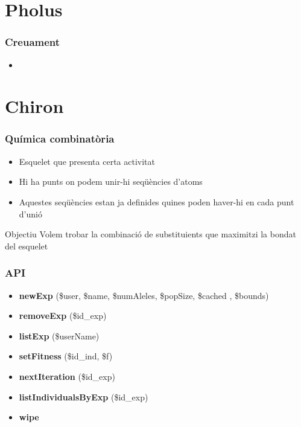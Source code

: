 \documentclass{beamer}
\begin{document}
\section{Pholus} %
\label{sec:Pholus}

\begin{frame}
	\frametitle{Creuament }
	\begin{itemize}
		\item 
	\end{itemize}
\end{frame}

\section{Chiron} %
\label{sec:Chiron}
\begin{frame}
	\frametitle{Química combinatòria}
	\begin{itemize}
		\item Esquelet que presenta certa activitat
		\item Hi ha punts on podem unir-hi seqüències d'atoms
		\item Aquestes seqüències estan ja definides quines poden haver-hi en cada punt d'unió
	\end{itemize}
	\pause
	\begin{block}{Objectiu}
		Volem trobar la combinació de substituients que maximitzi la bondat del esquelet
	\end{block}
\end{frame}

\begin{frame}
\end{frame}
\begin{frame}
	\frametitle{API}
	\begin{itemize}
		\item \textbf{newExp} (\$user, \$name, \$numAleles, \$popSize, \$cached , \$bounds)
		\item \textbf{removeExp} (\$id\_exp)
		\item \textbf{listExp} (\$userName)
		\item \textbf{setFitness} (\$id\_ind, \$f)
		\item \textbf{nextIteration} (\$id\_exp)
		\item \textbf{listIndividualsByExp} (\$id\_exp)
		\item \textbf{wipe}
	\end{itemize}
\end{frame}
\end{document}
